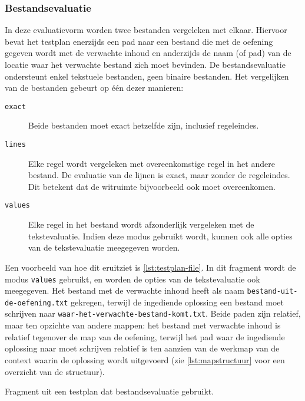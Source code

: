\subsubsection{Bestandsevaluatie}

In deze evaluatievorm worden twee bestanden vergeleken met elkaar.
Hiervoor bevat het testplan enerzijds een pad naar een bestand die met de oefening gegeven wordt met de verwachte inhoud en anderzijds de naam (of pad) van de locatie waar het verwachte bestand zich moet bevinden.
De bestandsevaluatie ondersteunt enkel tekstuele bestanden, geen binaire bestanden.
Het vergelijken van de bestanden gebeurt op één dezer manieren:

\begin{description}
    \item[\texttt{exact}] Beide bestanden moet exact hetzelfde zijn, inclusief regeleindes.
    \item[\texttt{lines}] Elke regel wordt vergeleken met overeenkomstige regel in het andere bestand.
    De evaluatie van de lijnen is exact, maar zonder de regeleindes.
    Dit betekent dat de witruimte bijvoorbeeld ook moet overeenkomen.
    \item[\texttt{values}] Elke regel in het bestand wordt afzonderlijk vergeleken met de tekstevaluatie.
    Indien deze modus gebruikt wordt, kunnen ook alle opties van de tekstevaluatie meegegeven worden.
\end{description}

Een voorbeeld van hoe dit eruitziet is \cref{lst:testplan-file}.
In dit fragment wordt de modus \texttt{values} gebruikt, en worden de opties van de tekstevaluatie ook meegegeven.
Het bestand met de verwachte inhoud heeft als naam \texttt{bestand-uit-de-oefening.txt} gekregen, terwijl de ingediende oplossing een bestand moet schrijven naar \texttt{waar-het-verwachte-bestand-komt.txt}.
Beide paden zijn relatief, maar ten opzichte van andere mappen: het bestand met verwachte inhoud is relatief tegenover de map van de oefening, terwijl het pad waar de ingediende oplossing naar moet schrijven relatief is ten aanzien van de werkmap van de context waarin de oplossing wordt uitgevoerd (zie \cref{lst:mapstructuur} voor een overzicht van de structuur).

\begin{listing}
    \caption{Fragment uit een testplan dat bestandsevaluatie gebruikt.}
    \label{lst:testplan-file}
    \inputminted[breaklines]{json}{code/testplan-file.json}
\end{listing}


